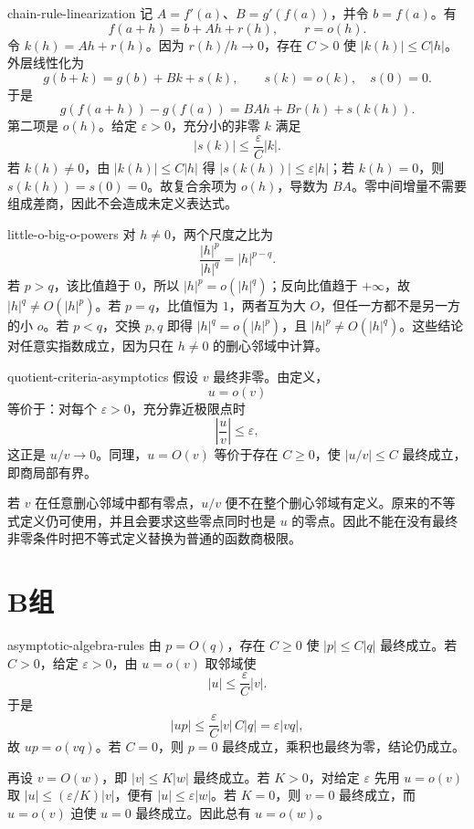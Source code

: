 \begin{solution}{chain-rule-linearization}
记 \(A=f'(a)\)、\(B=g'(f(a))\)，并令 \(b=f(a)\)。有
\[
 f(a+h)=b+Ah+r(h),\qquad r=o(h).
\]
令 \(k(h)=Ah+r(h)\)。因为 \(r(h)/h\to0\)，存在 \(C>0\) 使 \(|k(h)|\le C|h|\)。外层线性化为
\[
 g(b+k)=g(b)+Bk+s(k),\qquad s(k)=o(k),\quad s(0)=0.
\]
于是
\[
 g(f(a+h))-g(f(a))
 =BAh+B r(h)+s(k(h)).
\]
第二项是 \(o(h)\)。给定 \(\varepsilon>0\)，充分小的非零 \(k\) 满足
\[
 |s(k)|\le\frac{\varepsilon}{C}|k|.
\]
若 \(k(h)\ne0\)，由 \(|k(h)|\le C|h|\) 得 \(|s(k(h))|\le\varepsilon|h|\)；若 \(k(h)=0\)，则 \(s(k(h))=s(0)=0\)。故复合余项为 \(o(h)\)，导数为 \(BA\)。零中间增量不需要组成差商，因此不会造成未定义表达式。
\end{solution}

\begin{solution}{little-o-big-o-powers}
对 \(h\ne0\)，两个尺度之比为
\[
 \frac{|h|^p}{|h|^q}=|h|^{p-q}.
\]
若 \(p>q\)，该比值趋于 \(0\)，所以 \(|h|^p=o(|h|^q)\)；反向比值趋于 \(+\infty\)，故 \(|h|^q\ne O(|h|^p)\)。若 \(p=q\)，比值恒为 \(1\)，两者互为大 \(O\)，但任一方都不是另一方的小 \(o\)。若 \(p<q\)，交换 \(p,q\) 即得 \(|h|^q=o(|h|^p)\)，且 \(|h|^p\ne O(|h|^q)\)。这些结论对任意实指数成立，因为只在 \(h\ne0\) 的删心邻域中计算。
\end{solution}

\begin{solution}{quotient-criteria-asymptotics}
假设 \(v\) 最终非零。由定义，
\[
 u=o(v)
\]
等价于：对每个 \(\varepsilon>0\)，充分靠近极限点时
\[
 \left|\frac uv\right|\le\varepsilon,
\]
这正是 \(u/v\to0\)。同理，\(u=O(v)\) 等价于存在 \(C\ge0\)，使 \(|u/v|\le C\) 最终成立，即商局部有界。

若 \(v\) 在任意删心邻域中都有零点，\(u/v\) 便不在整个删心邻域有定义。原来的不等式定义仍可使用，并且会要求这些零点同时也是 \(u\) 的零点。因此不能在没有最终非零条件时把不等式定义替换为普通的函数商极限。
\end{solution}

\section*{B组}

\begin{solution}{asymptotic-algebra-rules}
由 \(p=O(q)\)，存在 \(C\ge0\) 使 \(|p|\le C|q|\) 最终成立。若 \(C>0\)，给定 \(\varepsilon>0\)，由 \(u=o(v)\) 取邻域使
\[
 |u|\le\frac{\varepsilon}{C}|v|.
\]
于是
\[
 |up|\le\frac{\varepsilon}{C}|v|\,C|q|
 =\varepsilon|vq|,
\]
故 \(up=o(vq)\)。若 \(C=0\)，则 \(p=0\) 最终成立，乘积也最终为零，结论仍成立。

再设 \(v=O(w)\)，即 \(|v|\le K|w|\) 最终成立。若 \(K>0\)，对给定 \(\varepsilon\) 先用 \(u=o(v)\) 取 \(|u|\le(\varepsilon/K)|v|\)，便有 \(|u|\le\varepsilon|w|\)。若 \(K=0\)，则 \(v=0\) 最终成立，而 \(u=o(v)\) 迫使 \(u=0\) 最终成立。因此总有 \(u=o(w)\)。
\end{solution}

